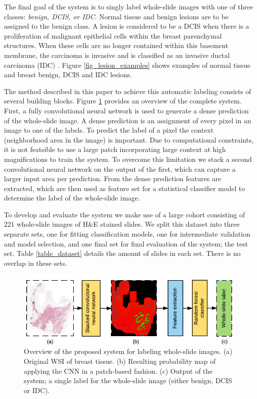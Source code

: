 \documentclass[journal]{IEEEtran}
\begin{document}
The final goal of the system is to singly label whole-slide images with one of three classes: \emph{benign, DCIS, or IDC}. Normal tissue and benign lesions are to be assigned to the benign class. A lesion is considered to be a DCIS when there is a proliferation of malignant epithelial cells within the breast parenchymal structures. When these cells are no longer contained within this basement membrane, the carcinoma is invasive and is classified as an invasive ductal carcinoma (IDC) \cite{ellis2010intraductal}. Figure \ref{fig_lesion_examples} shows examples of normal tissue and breast benign, DCIS and IDC lesions.


The method described in this paper to achieve this automatic labeling consists of several building blocks. Figure \ref{fig_overview} provides an overview of the complete system. First, a fully convolutional neural network is used to generate a dense prediction of the whole-slide image. A dense prediction is an assignment of every pixel in an image to one of the labels. To predict the label of a pixel the context (neighborhood area in the image) is important. Due to computational constraints, it is not featsible to use a large patch incorporating large context at high magnifications to train the system. To overcome this limitation we stack a second convolutional neural network on the output of the first, which can capture a larger input area per prediction. From the dense prediction features are extracted, which are then used as feature set for a statistical classifier model to determine the label of the whole-slide image.

To develop and evaluate the system we make use of a large cohort consisting of 221 whole-slide images of H\&E stained slides. We split this dataset into three separate sets, one for fitting classification models, one for intermediate validation and model selection, and one final set for final evaluation of the system; the test set. Table \ref{table_dataset} details the amount of slides in each set. There is no overlap in these sets.

\begin{figure}[!t]
\centering
\hspace{-0.08in}\includegraphics[width=6in]{system_overview}%
\vspace{-0.1cm}\caption{Overview of the proposed system for labeling whole-slide images. (a) Original WSI of breast tissue. (b) Resulting probability map of applying the CNN in a patch-based fashion. (c) Output of the system; a single label for the whole-slide image (either benign, DCIS or IDC).}
\label{fig_overview}
\end{figure}
\end{document}
